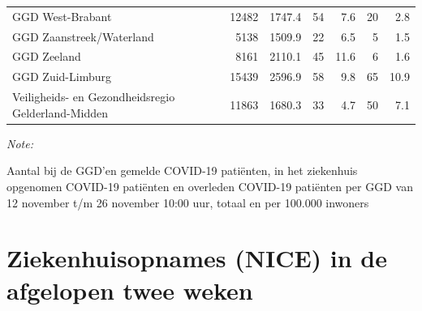 \documentclass[
  english,
  man,floatsintext]{apa6}
\begin{document}
\begin{table}
\begin{threeparttable}
\begin{tabular}{lrrrrrr}
GGD West-Brabant & 12482 & 1747.4 & 54 & 7.6 & 20 & 2.8\\
GGD Zaanstreek/Waterland & 5138 & 1509.9 & 22 & 6.5 & 5 & 1.5\\
GGD Zeeland & 8161 & 2110.1 & 45 & 11.6 & 6 & 1.6\\
GGD Zuid-Limburg & 15439 & 2596.9 & 58 & 9.8 & 65 & 10.9\\
Veiligheids- en Gezondheidsregio Gelderland-Midden & 11863 & 1680.3 & 33 & 4.7 & 50 & 7.1\\
\bottomrule
\end{tabular}
\begin{tablenotes}
\item \textit{Note: } 
\item Aantal bij de GGD’en gemelde COVID-19 patiënten, in het ziekenhuis opgenomen COVID-19 patiënten en overleden COVID-19 patiënten per GGD van 12 november t/m 26 november 10:00 uur, totaal en per 100.000 inwoners
\end{tablenotes}
\end{threeparttable}
\endgroup{}
\end{table}

\newpage

\hypertarget{ziekenhuisopnames-nice-in-de-afgelopen-twee-weken}{%
\section{Ziekenhuisopnames (NICE) in de afgelopen twee weken}\label{ziekenhuisopnames-nice-in-de-afgelopen-twee-weken}}
\end{document}
